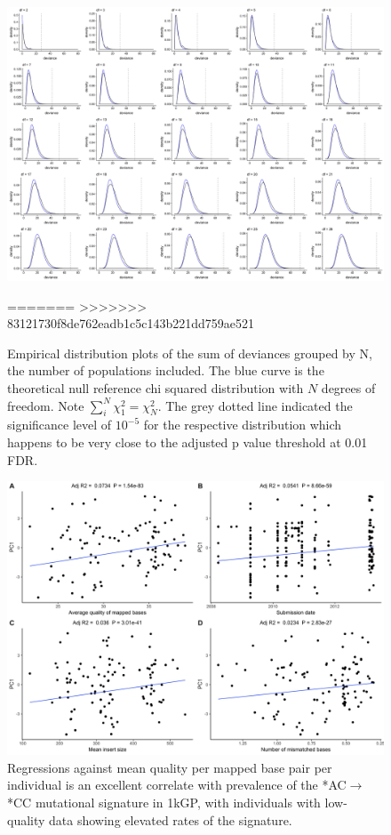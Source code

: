\documentclass[9pt,lineno]{elife}
\begin{document}
\begin{figure}
\includegraphics[width=\hsize,keepaspectratio]{./Figures/AllDeviances.jpg}

\caption{Empirical distribution plots of the sum of deviances grouped by N, the number of populations included. The blue curve is the theoretical null reference chi squared distribution with $N$ degrees of freedom. Note $\sum_i^N  \chi^2_1= \chi^2_N$. The grey dotted line indicated the significance level of $10^{-5}$ for the respective distribution which happens to be very close to the adjusted p value threshold at 0.01 FDR. }
  \label{Deviations}
=======
  \label{Deviances}
>>>>>>> 83121730f8de762eadb1c5c143b221dd759ae521
\end{figure}

\begin{figure}
\includegraphics[width=\hsize,keepaspectratio]{./Figures/PC1_Correlation.jpg}
\caption{Regressions against mean quality per mapped base pair per individual is an excellent correlate with prevalence of the  *AC${\rightarrow}$*CC mutational signature in 1kGP, with individuals with low-quality data showing elevated rates of the signature.  }
\label{PC1_Correlation}
\end{figure}
\end{document}
